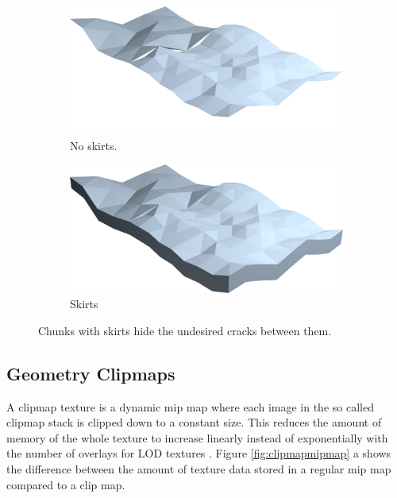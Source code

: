 \begin{figure}[htbp]
    \centering
    \begin{subfigure}[bt]{0.4\textwidth}
        \includegraphics[width=\textwidth]{figures/chunkedlod/skirts_without.png}
        \caption{No skirts.}
    \end{subfigure}
    \begin{subfigure}[bt]{0.4\textwidth}
        \includegraphics[width=\textwidth]{figures/chunkedlod/skirts_with.png}
        \caption{Skirts}
    \end{subfigure}
    \caption{Chunks with skirts hide the undesired cracks between them.}
    \label{fig:skirts}
\end{figure}


\subsection{Geometry Clipmaps}
A clipmap texture is a dynamic mip map where each image in the so called clipmap stack is clipped down to a constant size. This reduces the amount of memory of the whole texture to increase linearly instead of exponentially with the number of overlays for LOD textures \cite{tanner98}. Figure \ref{fig:clipmapmipmap} a shows the difference between the amount of texture data stored in a regular mip map compared to a clip map.

